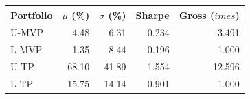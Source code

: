 \begin{tabular}{lrrrr}
\toprule
Portfolio & $\mu$ (\%) & $\sigma$ (\%) & Sharpe & Gross ($	imes$) \\
\midrule
U-MVP & 4.48 & 6.31 & 0.234 & 3.491 \\
L-MVP & 1.35 & 8.44 & -0.196 & 1.000 \\
U-TP & 68.10 & 41.89 & 1.554 & 12.596 \\
L-TP & 15.75 & 14.14 & 0.901 & 1.000 \\
\bottomrule
\end{tabular}
